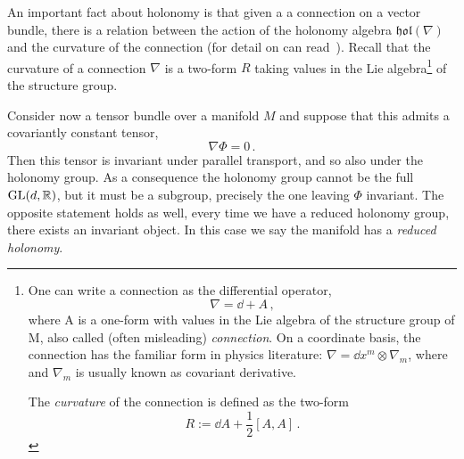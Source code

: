\documentclass[debug]{phd}
\begin{document}
					An important fact about holonomy is that given a a connection on a vector bundle, there is a relation between the action of the holonomy algebra $\mathfrak{hol}(\nabla)$ and the curvature of the connection (for detail on can read~\cite{holon2}).
					Recall that the curvature of a connection $\nabla$ is a two-form $R$ taking values in the Lie algebra\footnote{%
						One can write a connection as the differential operator,
								\begin{equation*}
									\nabla = \dd + A \, ,
								\end{equation*}
						where A is a one-form with values in the Lie algebra of the structure group of M, also called (often misleading) \emph{connection}.
						On a coordinate basis, the connection has the familiar form in physics literature: $\nabla = \dd x^m \otimes \nabla_m$, where and $\nabla_m$ is usually known as covariant derivative.
						
						The \emph{curvature} of the connection is defined as the two-form
							\begin{equation*}
								R := \dd A + \frac{1}{2} \left[A , A\right]\, .
							\end{equation*}
						}
					of the structure group.
					
					Consider now a tensor bundle over a manifold $M$ and suppose that this admits a covariantly constant tensor,
							\begin{equation*}
								\nabla \Phi = 0\, .
							\end{equation*}
					Then this tensor is invariant under parallel transport, and so also under the holonomy group.
					As a consequence the holonomy group cannot be the full $\mathrm{GL}(d, \mathbb{R})$, but it must be a subgroup, precisely the one leaving $\Phi$ invariant.
					The opposite statement holds as well, every time we have a reduced holonomy group, there exists an invariant object.
					In this case we say the manifold has a \emph{reduced holonomy}.
					
\end{document}
